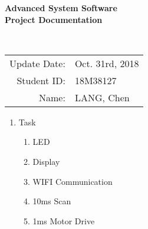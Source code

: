\documentclass[12pt]{article}
\begin{document}
\begin{center}
\large\bf Advanced System Software \\
Project Documentation\\
\end{center}

\begin{center}
	\\
\end{center}

\bigskip

\begin{center}
	\begin{tabular}{rl}
	\smallskip
	Update Date:& Oct. 31rd, 2018\\
	\smallskip
	Student ID:& 18M38127\\
	\smallskip
	Name:& LANG, Chen\\
	\end{tabular}
\end{center}

\pagebreak
\bfseries
\begin{enumerate}
	\item Task
	\begin{enumerate}
		\normalfont
		\item LED
		\item Display
		\item WIFI Communication
		\item 10ms Scan
		\item 1ms Motor Drive
	\end{enumerate}
	

\end{enumerate}
\end{document}
